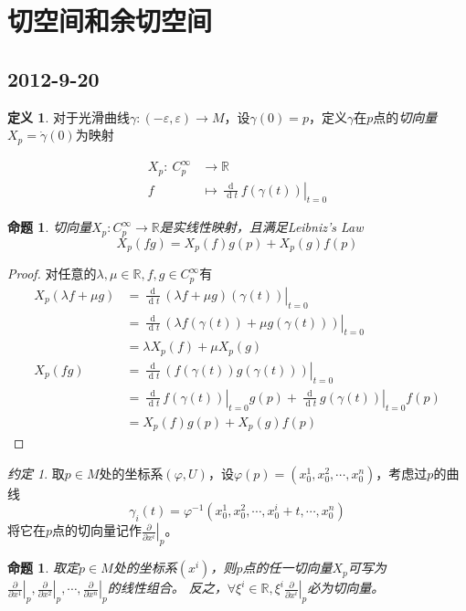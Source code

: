 \documentclass[winfonts,UTF8,c5size,a4paper,fancyhdr,hyperref,titlepage,nocap]{ctexart}
\newtheorem{prop}[thm]{命题}
\theoremstyle{definition}
\newtheorem{defn}[thm]{定义}
\theoremstyle{remark}
\newtheorem*{note}{约定}
\numberwithin{equation}{subsection}
\newcommand{\Real}{\mathbb{R}}
\newcommand{\red}{\color{red}}
\newcommand{\dt}{\frac{\operatorname{d}}{\operatorname{d}t}}
\newcommand{\pfrac}[2]{\frac{\partial{#1}}{\partial{#2}}}
\newcommand{\px}[1]{\left.\pfrac{}{x^{#1}}\right|_p}
\newcommand{\local}[2]{\left.{#1}\right|_{#2}}%
\newcommand{\localt}[1]{\local{#1}{t=0}}%
\newcommand{\mapdes}[5]
  {
    \begin{align*}
      #1\colon\  #2 & \longrightarrow  #3 \\
            #4 & \mapsto  #5
    \end{align*}
  }
\begin{document}
\section{切空间和余切空间}
\subsection*{2012-9-20}
\begin{defn}
对于光滑曲线$\gamma\colon(-\varepsilon,\varepsilon)\to M$，设$\gamma(0)=p$，定义$\gamma$在$p$点的\emph{\red 切向量} $X_p=\dot{\gamma}(0)$为映射
\mapdes{X_p}{C^{\infty}_p}{\Real}{f}{\localt{\dt f(\gamma(t))}}
\end{defn}
\begin{prop}
切向量$X_p\colon C^{\infty}_p\to\Real$是实线性映射，且满足{\red Leibniz's Law}
\begin{equation*}
X_p(fg)=X_p(f)g(p)+X_p(g)f(p)
\end{equation*}
\end{prop}
\begin{proof}
  对任意的$\lambda, \mu\in\Real, f,g\in C^{\infty}_p$有
\begin{align*}
X_p(\lambda f+\mu g)&=\localt{\dt(\lambda f+\mu g)(\gamma(t))}\\
                    &=\localt{\dt(\lambda f(\gamma(t))+\mu g(\gamma(t)))}\\
                    &=\lambda X_p(f)+\mu X_p(g)\\
X_p(fg)&=\localt{\dt(f(\gamma(t))g(\gamma(t)))}\\
       &=\localt{\dt f(\gamma(t))}g(p)+\localt{\dt g(\gamma(t))}f(p)\\
       &=X_p(f)g(p)+X_p(g)f(p)
\end{align*}
\end{proof}
\begin{note}
  取$p\in M$处的坐标系$(\varphi,U)$，设$\varphi(p)=(x_0^1,x_0^2,\cdots,x_0^n)$，考虑过$p$的曲线
\begin{equation*}
\gamma_i(t)=\varphi^{-1}(x_0^1,x_0^2,\cdots,x_0^i+t,\cdots,x_0^n)
\end{equation*}
将它在$p$点的切向量记作$\px{i}$。
\end{note}
\begin{prop}
取定$p\in M$处的坐标系$(x^i)$，则$p$点的任一切向量$X_p$可写为$\px{1},\px{2},\cdots,\px{n}$的线性组合。
反之，$\forall \xi^i\in\Real, \xi^i\px{i}$必为切向量。
\end{prop}
\end{document}
